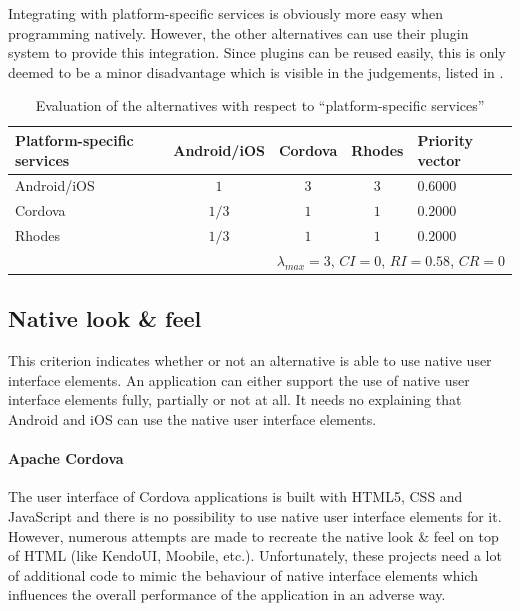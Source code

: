 Integrating with platform-specific services is obviously more easy when programming natively. However, the other alternatives can use their plugin system to provide this integration. Since plugins can be reused easily, this is only deemed to be a minor disadvantage which is visible in the judgements, listed in . 

\begin{table}[h!]
    \centering
    \begin{tabular}{lcccl}
        \hline
        \textbf{Platform-specific services} & Android/iOS & Cordova & Rhodes & Priority vector \\
        \hline
        Android/iOS                         & $1$         & $3$     & $3$   & $0.6000$         \\
        Cordova                             & $1/3$       & $1$     & $1$   & $0.2000$         \\
        Rhodes                              & $1/3$       & $1$     & $1$   & $0.2000$         \\
        \hline
        \multicolumn{5}{r}{$\lambda_{max} = 3$, $CI = 0$, $RI = 0.58$, $CR = 0$}               \\
        \hline
    \end{tabular}
    \caption{Evaluation of the alternatives with respect to ``platform-specific services''}
    \label{tab:pss}
\end{table}

\subsection{Native look \& feel}

This criterion indicates whether or not an alternative is able to use native user interface elements. An application can either support the use of native user interface elements fully, partially or not at all. It needs no explaining that Android and iOS can use the native user interface elements.

\paragraph{Apache Cordova} The user interface of Cordova applications is built with HTML5, CSS and JavaScript and there is no possibility to use native user interface elements for it. However, numerous attempts are made to recreate the native look \& feel on top of HTML (like KendoUI, Moobile, etc.). Unfortunately, these projects need a lot of additional code to mimic the behaviour of native interface elements which influences the overall performance of the application in an adverse way.

